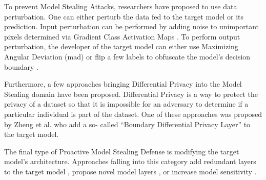 To prevent Model Stealing Attacks, researchers have proposed to use data perturbation. One can either perturb the data fed to the target model or its prediction.
Input perturbation can be performed by adding noise to unimportant pixels determined via Gradient Class Activation Maps \cite{guiga2020neural}. To perform output perturbation,
the developer of the target model can either use Maximizing Angular Deviation (\gls{mad}) \cite{orekondy2019prediction} or flip a few labels to obfuscate the model's decision boundary
\cite{shi2017evasion}. \par
Furthermore, a few approaches bringing Differential Privacy into the Model Stealing domain have been proposed. Differential Privacy is a way to protect the privacy of a dataset so that 
it is impossible for an adversary to determine if a particular individual is part of the dataset. One of these approaches was proposed by Zheng et al. \cite{zheng2019bdpl} who add a so-
called \enquote{Boundary Differential Privacy Layer} to the target model. \par
The final type of Proactive Model Stealing Defense is modifying the target model's architecture. Approaches falling into this category add redundant layers to the target model 
\cite{chabanne2020protection}, propose novel model layers \cite{xu2018deepobfuscation}, or increase model sensitivity \cite{szentannai2020preventing}.
